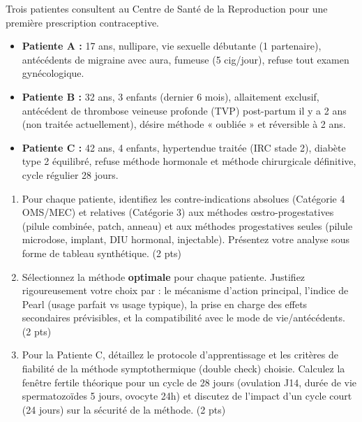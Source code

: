 \documentclass[11pt]{article}
\begin{document}
\begin{exercice}
Trois patientes consultent au Centre de Santé de la Reproduction pour une première prescription contraceptive.
\begin{itemize}
    \item \textbf{Patiente A :} 17 ans, nullipare, vie sexuelle débutante (1 partenaire), antécédents de migraine avec aura, fumeuse (5 cig/jour), refuse tout examen gynécologique.
    \item \textbf{Patiente B :} 32 ans, 3 enfants (dernier 6 mois), allaitement exclusif, antécédent de thrombose veineuse profonde (TVP) post-partum il y a 2 ans (non traitée actuellement), désire méthode « oubliée » et réversible à 2 ans.
    \item \textbf{Patiente C :} 42 ans, 4 enfants, hypertendue traitée (IRC stade 2), diabète type 2 équilibré, refuse méthode hormonale et méthode chirurgicale définitive, cycle régulier 28 jours.
\end{itemize}

\begin{enumerate}
    \item Pour chaque patiente, identifiez les contre-indications absolues (Catégorie 4 OMS/MEC) et relatives (Catégorie 3) aux méthodes œstro-progestatives (pilule combinée, patch, anneau) et aux méthodes progestatives seules (pilule microdose, implant, DIU hormonal, injectable). Présentez votre analyse sous forme de tableau synthétique. (2 pts)
    \item Sélectionnez la méthode \textbf{optimale} pour chaque patiente. Justifiez rigoureusement votre choix par : le mécanisme d'action principal, l'indice de Pearl (usage parfait vs usage typique), la prise en charge des effets secondaires prévisibles, et la compatibilité avec le mode de vie/antécédents. (2 pts)
    \item Pour la Patiente C, détaillez le protocole d'apprentissage et les critères de fiabilité de la méthode symptothermique (double check) choisie. Calculez la fenêtre fertile théorique pour un cycle de 28 jours (ovulation J14, durée de vie spermatozoïdes 5 jours, ovocyte 24h) et discutez de l'impact d'un cycle court (24 jours) sur la sécurité de la méthode. (2 pts)
\end{enumerate}
\end{exercice}
\end{document}
